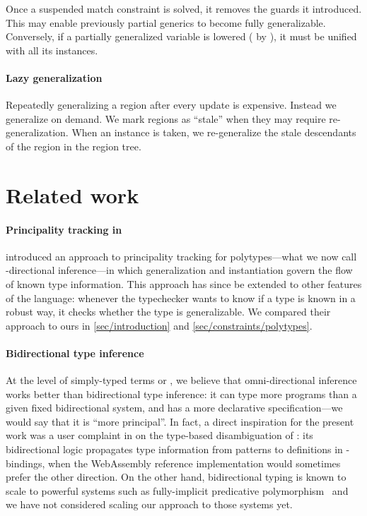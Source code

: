\documentclass[acmsmall,screen,nonacm,review]{acmart}
\begin{document}
Once a suspended match constraint is solved, it removes the guards it
introduced. This may enable previously partial generics to become fully
generalizable. Conversely, if a partially generalized variable is lowered (\eg
by ), it must be unified with all its instances.

\paragraph{Lazy generalization} Repeatedly generalizing a region after every
update is expensive.  Instead we generalize on demand. We mark regions as
``stale'' when they may require re-generalization. When an instance is taken,
we re-generalize the stale descendants of the region in the region tree.

\section{Related work}
\label{sec:related-work}


\paragraph{Principality tracking in \OCaml}

\citet*{Garrigue-Remy/poly-ml} introduced an approach to principality tracking
for polytypes---what we now call \geninst-directional inference---in which
generalization and instantiation govern the flow of known type information.
This approach has since be extended to other features of the \OCaml language:
whenever the typechecker wants to know if a type is known in a robust way, it
checks whether the type is generalizable. We compared their approach to ours in
\cref{sec/introduction} and \cref{sec/constraints/polytypes}.

\paragraph{Bidirectional type inference}

At the level of simply-typed
terms or \ML, we believe that omni-directional inference works better
than bidirectional type inference: it can type more programs than
a given fixed bidirectional system, and has a more declarative
specification---we would say that it is ``more principal''.  In fact,
a direct inspiration for the present work was a user complaint in
\citet*{rossberg-wasm} on the type-based disambiguation of \OCaml: its
bidirectional logic propagates type information from patterns to
definitions in -bindings, when the WebAssembly reference
implementation would sometimes prefer the other direction.
%
%
On the other hand, bidirectional typing is known to scale to powerful
systems such as fully-implicit predicative
polymorphism~\citep*{dunfield-krishnaswami-bidirectional-poly} and we
have not considered scaling our approach to those systems yet.
\end{document}
